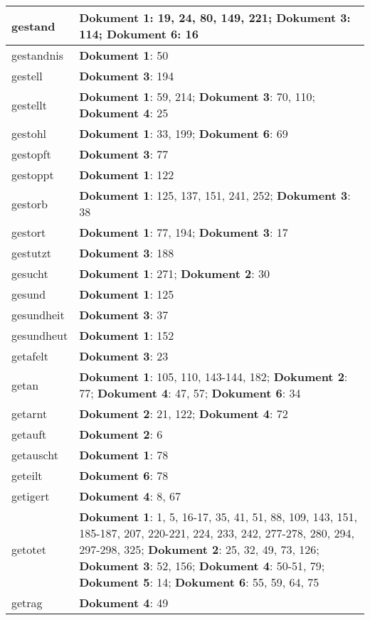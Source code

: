 \documentclass[a5paper]{article}
\begin{document}
\begin{longtable}[l]{|l|p{3in}|}
\hline
gestand & \textbf{Dokument 1}: 19, 24, 80, 149, 221; \textbf{Dokument 3}: 114; \textbf{Dokument 6}: 16 \\
\hline
gestandnis & \textbf{Dokument 1}: 50 \\
\hline
gestell & \textbf{Dokument 3}: 194 \\
\hline
gestellt & \textbf{Dokument 1}: 59, 214; \textbf{Dokument 3}: 70, 110; \textbf{Dokument 4}: 25 \\
\hline
gestohl & \textbf{Dokument 1}: 33, 199; \textbf{Dokument 6}: 69 \\
\hline
gestopft & \textbf{Dokument 3}: 77 \\
\hline
gestoppt & \textbf{Dokument 1}: 122 \\
\hline
gestorb & \textbf{Dokument 1}: 125, 137, 151, 241, 252; \textbf{Dokument 3}: 38 \\
\hline
gestort & \textbf{Dokument 1}: 77, 194; \textbf{Dokument 3}: 17 \\
\hline
gestutzt & \textbf{Dokument 3}: 188 \\
\hline
gesucht & \textbf{Dokument 1}: 271; \textbf{Dokument 2}: 30 \\
\hline
gesund & \textbf{Dokument 1}: 125 \\
\hline
gesundheit & \textbf{Dokument 3}: 37 \\
\hline
gesundheut & \textbf{Dokument 1}: 152 \\
\hline
getafelt & \textbf{Dokument 3}: 23 \\
\hline
getan & \textbf{Dokument 1}: 105, 110, 143-144, 182; \textbf{Dokument 2}: 77; \textbf{Dokument 4}: 47, 57; \textbf{Dokument 6}: 34 \\
\hline
getarnt & \textbf{Dokument 2}: 21, 122; \textbf{Dokument 4}: 72 \\
\hline
getauft & \textbf{Dokument 2}: 6 \\
\hline
getauscht & \textbf{Dokument 1}: 78 \\
\hline
geteilt & \textbf{Dokument 6}: 78 \\
\hline
getigert & \textbf{Dokument 4}: 8, 67 \\
\hline
getotet & \textbf{Dokument 1}: 1, 5, 16-17, 35, 41, 51, 88, 109, 143, 151, 185-187, 207, 220-221, 224, 233, 242, 277-278, 280, 294, 297-298, 325; \textbf{Dokument 2}: 25, 32, 49, 73, 126; \textbf{Dokument 3}: 52, 156; \textbf{Dokument 4}: 50-51, 79; \textbf{Dokument 5}: 14; \textbf{Dokument 6}: 55, 59, 64, 75 \\
\hline
getrag & \textbf{Dokument 4}: 49 \\

\end{longtable}
\end{document}
